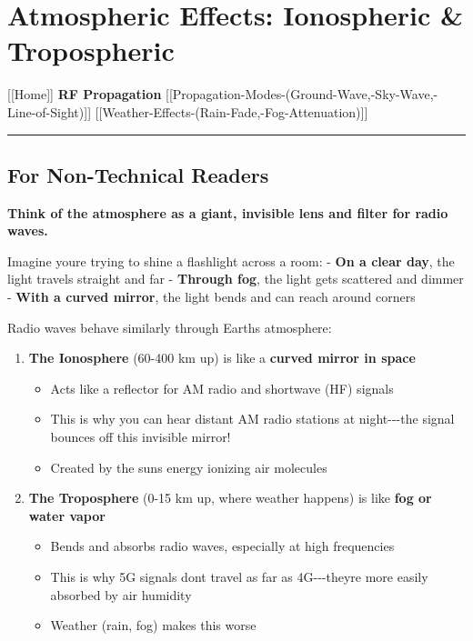\section{Atmospheric Effects: Ionospheric \&
Tropospheric}\label{atmospheric-effects-ionospheric-tropospheric}

{[}{[}Home{]}{]} \textbar{} \textbf{RF Propagation} \textbar{}
{[}{[}Propagation-Modes-(Ground-Wave,-Sky-Wave,-Line-of-Sight){]}{]}
\textbar{} {[}{[}Weather-Effects-(Rain-Fade,-Fog-Attenuation){]}{]}

\begin{center}\rule{0.5\linewidth}{0.5pt}\end{center}

\subsection{\texorpdfstring{ For Non-Technical
Readers}{ For Non-Technical Readers}}\label{for-non-technical-readers}

\textbf{Think of the atmosphere as a giant, invisible lens and filter
for radio waves.}

Imagine you\textquotesingle re trying to shine a flashlight across a
room: - \textbf{On a clear day}, the light travels straight and far -
\textbf{Through fog}, the light gets scattered and dimmer - \textbf{With
a curved mirror}, the light bends and can reach around corners

Radio waves behave similarly through Earth\textquotesingle s atmosphere:

\begin{enumerate}
\def\labelenumi{\arabic{enumi}.}
\tightlist
\item
  \textbf{The Ionosphere} (60-400 km up) is like a \textbf{curved mirror
  in space}

  \begin{itemize}
  \tightlist
  \item
    Acts like a reflector for AM radio and shortwave (HF) signals
  \item
    This is why you can hear distant AM radio stations at
    night-\/-\/-the signal bounces off this invisible mirror!
  \item
    Created by the sun\textquotesingle s energy ionizing air molecules
  \end{itemize}
\item
  \textbf{The Troposphere} (0-15 km up, where weather happens) is like
  \textbf{fog or water vapor}

  \begin{itemize}
  \tightlist
  \item
    Bends and absorbs radio waves, especially at high frequencies
  \item
    This is why 5G signals don\textquotesingle t travel as far as
    4G-\/-\/-they\textquotesingle re more easily absorbed by air
    humidity
  \item
    Weather (rain, fog) makes this worse
  \end{itemize}
\end{enumerate}

